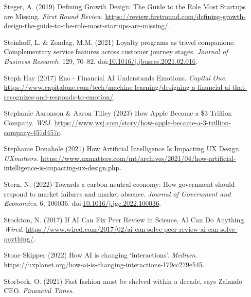 \documentclass[
  letterpaper,
  DIV=11,
  numbers=noendperiod]{scrartcl}
\newlength{\cslhangindent}
\newenvironment{CSLReferences}[2] %
 {\begin{list}{}{%
  \setlength{\itemindent}{0pt}
  \setlength{\leftmargin}{0pt}
  \setlength{\parsep}{0pt}
  \ifodd #1
   \setlength{\leftmargin}{\cslhangindent}
   \setlength{\itemindent}{-1\cslhangindent}
  \fi
  \setlength{\itemsep}{#2\baselineskip}}}
 {\end{list}}
\begin{document}
\begin{CSLReferences}{0}{1}
Steger, A. (2019) Defining {Growth Design}: {The Guide} to the {Role
Most Startups} are {Missing}. \emph{First Round Review}.
\url{https://review.firstround.com/defining-growth-design-the-guide-to-the-role-most-startups-are-missing/}.

Steinhoff, L. \& Zondag, M.M. (2021) Loyalty programs as travel
companions: {Complementary} service features across customer journey
stages. \emph{Journal of Business Research}. 129, 70--82.
doi:\href{https://doi.org/10.1016/j.jbusres.2021.02.016}{10.1016/j.jbusres.2021.02.016}.

Steph Hay (2017) Eno - {Financial AI Understands Emotions}.
\emph{Capital One}.
\url{https://www.capitalone.com/tech/machine-learning/designing-a-financial-ai-that-recognizes-and-responds-to-emotion/}.

Stephanie Aaronson \& Aaron Tilley (2023) How {Apple Became} a \$3
{Trillion Company}. \emph{WSJ}.
\url{https://www.wsj.com/story/how-apple-became-a-3-trillion-company-457d457c}.

Stephanie Donahole (2021) How {Artificial Intelligence Is Impacting UX
Design}. \emph{UXmatters}.
\url{https://www.uxmatters.com/mt/archives/2021/04/how-artificial-intelligence-is-impacting-ux-design.php}.

Stern, N. (2022) Towards a carbon neutral economy: {How} government
should respond to market failures and market absence. \emph{Journal of
Government and Economics}. 6, 100036.
doi:\href{https://doi.org/10.1016/j.jge.2022.100036}{10.1016/j.jge.2022.100036}.

Stockton, N. (2017) If {AI Can Fix Peer Review} in {Science}, {AI Can Do
Anything}. \emph{Wired}.
\url{https://www.wired.com/2017/02/ai-can-solve-peer-review-ai-can-solve-anything/}.

Stone Skipper (2022) How {AI} is changing {`interactions'}.
\emph{Medium}.
\url{https://uxplanet.org/how-ai-is-changing-interactions-179cc279e545}.

Storbeck, O. (2021) Fast fashion must be shelved within a decade, says
{Zalando CEO}. \emph{Financial Times}.


\end{CSLReferences}
\end{document}
